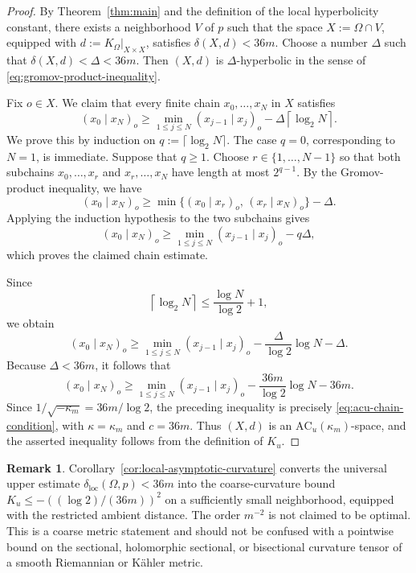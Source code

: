 \documentclass[11pt]{article}
\theoremstyle{definition}
\newtheorem{remark}[theorem]{Remark}
\begin{document}
\begin{proof}
	By Theorem~\ref{thm:main} and the definition of the local
	hyperbolicity constant, there exists a neighborhood \(V\) of \(p\)
	such that the space \(X:=\Omega\cap V\), equipped with
	\(d:=\left.K_\Omega\right|_{X\times X}\), satisfies
	\(\delta(X,d)<36m\).
	Choose a number \(\Delta\) such that
	\(\delta(X,d)<\Delta<36m\).
	Then \((X,d)\) is \(\Delta\)-hyperbolic in the sense of
	\eqref{eq:gromov-product-inequality}.
	
	Fix \(o\in X\).  We claim that every finite chain
	\(x_0,\ldots,x_N\) in \(X\) satisfies
	\begin{equation*}
		(x_0\mid x_N)_o
		\ge
		\min_{1\le j\le N}(x_{j-1}\mid x_j)_o
		-
		\Delta\left\lceil\log_2 N\right\rceil.
	\end{equation*}
	We prove this by induction on \(q:=\lceil\log_2 N\rceil\).
	The case \(q=0\), corresponding to \(N=1\), is immediate.  Suppose
	that \(q\ge1\).  Choose \(r\in\{1,\ldots,N-1\}\) so that both
	subchains \(x_0,\ldots,x_r\) and \(x_r,\ldots,x_N\) have length at
	most \(2^{q-1}\).  By the Gromov-product inequality, we have
	\[
	(x_0\mid x_N)_o
	\ge
	\min\bigl\{
	(x_0\mid x_r)_o,\,
	(x_r\mid x_N)_o
	\bigr\}
	-\Delta.
	\]
	Applying the induction hypothesis to the two subchains gives
	\[
	(x_0\mid x_N)_o
	\ge
	\min_{1\le j\le N}(x_{j-1}\mid x_j)_o
	-q\Delta,
	\]
	which proves the claimed chain estimate.
	
	Since
	\[
	\left\lceil\log_2 N\right\rceil
	\le
	\frac{\log N}{\log 2}+1,
	\]
	we obtain
	\[
	(x_0\mid x_N)_o
	\ge
	\min_{1\le j\le N}(x_{j-1}\mid x_j)_o
	-
	\frac{\Delta}{\log 2}\log N
	-\Delta.
	\]
	Because \(\Delta<36m\), it follows that
	\[
	(x_0\mid x_N)_o
	\ge
	\min_{1\le j\le N}(x_{j-1}\mid x_j)_o
	-
	\frac{36m}{\log 2}\log N
	-36m.
	\]
	Since \(1/\sqrt{-\kappa_m}=36m/\log2\), the preceding inequality
	is precisely
	\eqref{eq:acu-chain-condition}, with \(\kappa=\kappa_m\) and
	\(c=36m\).  Thus \((X,d)\) is an
	\(\mathrm{AC}_u(\kappa_m)\)-space, and
	the asserted inequality follows from the definition of
	\(K_u\).
\end{proof}

\begin{remark}
Corollary~\ref{cor:local-asymptotic-curvature} converts the universal
upper estimate \(\delta_{\mathrm{loc}}(\Omega,p)<36m\) into the
coarse-curvature bound \(K_u\le-((\log2)/(36m))^2\) on a sufficiently
small neighborhood, equipped with the restricted ambient distance.
The order \(m^{-2}\) is not claimed to be optimal.  This is a coarse metric
statement and should not be confused with a pointwise bound on the sectional,
holomorphic sectional, or bisectional curvature tensor of a smooth
Riemannian or K\"ahler metric.
\end{remark}
\end{document}
